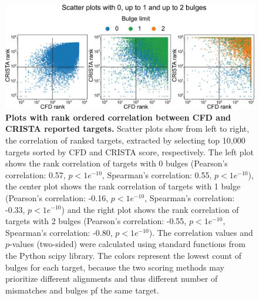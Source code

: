 \documentclass[a4paper, titlepage, openright]{book}
\begin{document}
\begin{figure}
	\centering
	\includegraphics[width=\textwidth]{figures/crisprme3.png}
	\caption[Plots with rank ordered correlation between CFD and CRISTA reported targets]{\textbf{Plots with rank ordered correlation between CFD and CRISTA reported targets.} Scatter plots show from left to right, the correlation of ranked targets, extracted by selecting top 10,000 targets sorted by CFD and CRISTA score, respectively. The left plot shows the rank correlation of targets with 0 bulges (Pearson's correlation: 0.57, $p < 1e^{-10}$, Spearman's correlation: 0.55, $p < 1e^{-10}$), the center plot shows the rank correlation of targets with 1 bulge (Pearson's correlation: -0.16, $p < 1e^{-10}$, Spearman's correlation: -0.33, $p < 1e^{-10}$) and the right plot shows the rank correlation of targets with 2 bulges (Pearson's correlation: -0.55, $p < 1e^{-10}$, Spearman's correlation: -0.80, $p < 1e^{-10}$). The correlation values and $p$-values (two-sided) were calculated using standard functions from the Python scipy library. The colors represent the lowest count of bulges for each target, because the two scoring methods may prioritize different alignments and thus different number of mismatches and bulges pf the same target.}
	\label{fig:crisprme3}
\end{figure}
\end{document}
